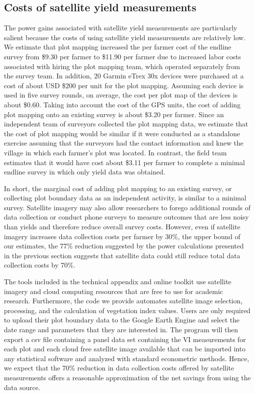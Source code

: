 \documentclass{article}
\begin{document}
\subsection{Costs of satellite yield measurements}

The power gains associated with satellite yield measurements are particularly salient because the costs of using satellite yield measurements are relatively low. We estimate that plot mapping increased the per farmer cost of the endline survey from \$9.30 per farmer to \$11.90 per farmer due to increased labor costs associated with hiring the plot mapping team, which operated separately from the survey team. In addition, 20 Garmin eTrex 30x devices were purchased at a cost of about USD \$200 per unit for the plot mapping. Assuming each device is used in five survey rounds, on average, the cost per plot map of the devices is about \$0.60. Taking into account the cost of the GPS units, the cost of adding plot mapping onto an existing survey is about \$3.20 per farmer. Since an independent team of surveyors collected the plot mapping data, we estimate that the cost of plot mapping would be similar if it were conducted as a standalone exercise assuming that the surveyors had the contact information and knew the village in which each farmer’s plot was located. In contrast, the field team estimates that it would have cost about \$3.11 per farmer to complete a minimal endline survey in which only yield data was obtained. 

In short, the marginal cost of adding plot mapping to an existing survey, or collecting plot boundary data as an independent activity, is similar to a minimal survey. Satellite imagery may also allow researchers to forego additional rounds of data collection or conduct phone surveys to measure outcomes that are less noisy than yields and therefore reduce overall survey costs. However, even if satellite imagery increases data collection costs per farmer by 30\%, the upper bound of our estimates, the 77\% reduction suggested by the power calculations presented in the previous section suggests that satellite data could still reduce total data collection costs by 70\%.

The tools included in the technical appendix and online toolkit use satellite imagery and cloud computing resources that are free to use for academic research. Furthermore, the code we provide automates satellite image selection, processing, and the calculation of vegetation index values. Users are only required to upload their plot boundary data to the Google Earth Engine and select the date range and parameters that they are interested in. The program will then export a csv file containing a panel data set containing the VI measurements for each plot and each cloud free satellite image available that can be imported into any statistical software and analyzed with standard econometric methods. Hence, we expect that the 70\% reduction in data collection costs offered by satellite measurements offers a reasonable approximation of the net savings from using the data source.
\end{document}

